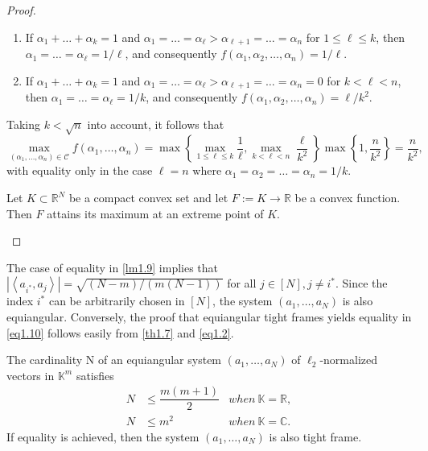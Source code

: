 \begin{proof}
\begin{enumerate}
    \item If $\alpha_1+\dots+\alpha_k = 1$ and $\alpha_1=\dots=\alpha_{\ell} > \alpha_{\ell+1}=\dots=\alpha_n$ for $1 \leq \ell \leq k$, then $\alpha_1 = \dots = \alpha_{\ell} = 1/\ell$, and consequently $f(\alpha_1,\alpha_2,\dots,\alpha_n)=1/\ell$.
    \item If $\alpha_1+\dots+\alpha_k = 1$ and $\alpha_1=\dots=\alpha_{\ell}>\alpha_{\ell+1}=\dots=\alpha_n=0$ for $k<\ell<n$, then $\alpha_1=\dots=\alpha_{\ell}=1/k$, and consequently $f(\alpha_1,\alpha_2,\dots,\alpha_n) = \ell/k^2$.
\end{enumerate}
Taking $k<\sqrt{n}$ into account, it follows that
\[
    \max\limits_{(\alpha_1,\dots,\alpha_n)\in\mathcal{C}} f(\alpha_1,\dots,\alpha_n) = \max\left\{ \max\limits_{1 \leq \ell \leq k}\dfrac{1}{\ell}, \max\limits_{k<\ell<n}\dfrac{\ell}{k^2} \right\} \max\left\{ 1, \dfrac{n}{k^2} \right\} = \dfrac{n}{k^2},
\]
with equality only in the case $\ell=n$ where $\alpha_1=\alpha_2=\dots=\alpha_n=1/k$.
    \begin{mdframed}
        \begin{theorem}
            \label{thb.16}
            Let $K \subset \mathbb{R}^N$ be a compact convex set and let $F := K \rightarrow \mathbb{R}$ be a convex function. Then $F$ attains its maximum at an extreme point of $K$.
        \end{theorem}
    \end{mdframed}
\end{proof}

The case of equality in \cref{lm1.9} implies that $\left|\left<a_{i^*}, a_j\right>\right| = \sqrt{(N-m)/(m(N-1))}$ for all $j \in [N], j\neq i^*$. Since the index $i^*$ can be arbitrarily chosen in $[N]$, the system $(a_1,\dots,a_N)$ is also equiangular. Conversely, the proof that equiangular tight frames yields equality in \cref{eq1.10} follows easily from \cref{th1.7} and \cref{eq1.2}. 

\begin{theorem}
    \label{th1.10}
    The cardinality N of an equiangular system $(a_1,\dots,a_N)$ of $\ell_2$-normalized vectors in $\mathbb{K}^m$ satisfies
    \begin{align*}
        N &\leq \dfrac{m(m+1)}{2}    &when\ \mathbb{K} = \mathbb{R},\\
        N &\leq m^2     &when\ \mathbb{K} = \mathbb{C}.
    \end{align*}
    If equality is achieved, then the system $(a_1,\dots,a_N)$ is also tight frame.
\end{theorem}

